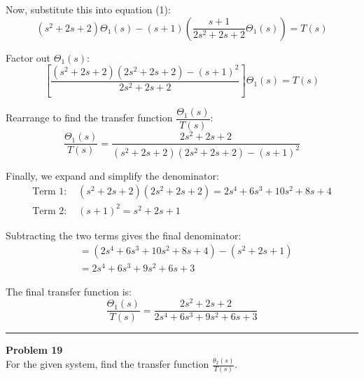 \documentclass[11pt]{article}
\begin{document}
Now, substitute this into equation (1):
\[
(s^2 + 2s + 2)\Theta_1(s) - (s + 1) \left( \frac{s + 1}{2s^2 + 2s + 2} \Theta_1(s) \right) = T(s)
\]

Factor out $\Theta_1(s)$:
\[
\left[ \frac{(s^2 + 2s + 2)(2s^2 + 2s + 2) - (s + 1)^2}{2s^2 + 2s + 2} \right] \Theta_1(s) = T(s)
\]

Rearrange to find the transfer function $\dfrac{\Theta_1(s)}{T(s)}$:
\[
\frac{\Theta_1(s)}{T(s)} = \frac{2s^2 + 2s + 2}{(s^2 + 2s + 2)(2s^2 + 2s + 2) - (s + 1)^2}
\]

Finally, we expand and simplify the denominator:
\begin{align*}
    \text{Term 1: } & (s^2 + 2s + 2)(2s^2 + 2s + 2) = 2s^4 + 6s^3 + 10s^2 + 8s + 4 \\
    \text{Term 2: } & (s + 1)^2 = s^2 + 2s + 1
\end{align*}

Subtracting the two terms gives the final denominator:
\begin{align*}
&= (2s^4 + 6s^3 + 10s^2 + 8s + 4) - (s^2 + 2s + 1) \\
&= 2s^4 + 6s^3 + 9s^2 + 6s + 3
\end{align*}

The final transfer function is:
\[
\boxed{\frac{\Theta_1(s)}{T(s)} = \frac{2s^2 + 2s + 2}{2s^4 + 6s^3 + 9s^2 + 6s + 3}}
\]




\newpage
  \setcounter{page}{36}  
\noindent\rule{\textwidth}{1pt}
\noindent\textbf{Problem 19} \hfill 
\\ For the given system, find the transfer function $\frac{\theta_2(s)}{T(s)}$.
\end{document}
